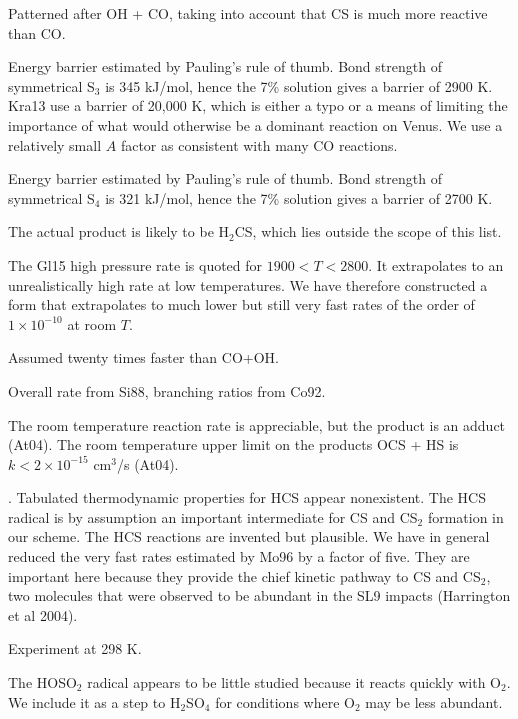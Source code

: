 \documentclass[12pt,landscape]{article}
\newcounter{reaction}
\begin{document}
  Patterned after OH + CO, taking into account that CS is much more reactive than CO.

  Energy barrier estimated by Pauling's rule of thumb.  Bond strength of symmetrical S$_3$ is 345 kJ/mol, hence the 7\% solution gives a barrier of 2900 K.  Kra13 use a barrier of 20,000 K, which is either a typo or a means of limiting the importance of what would otherwise be a dominant reaction on Venus.  We use a relatively small $A$ factor as consistent with many CO reactions.

   Energy barrier estimated by Pauling's rule of thumb.  Bond strength of symmetrical S$_4$ is 321 kJ/mol, hence the 7\% solution gives a barrier of 2700 K.  

  The actual product is likely to be H$_2$CS, which lies outside the scope of this list.

  The Gl15  high pressure rate is quoted for $1900<T<2800$.  It extrapolates to an unrealistically high rate at low temperatures. 
We have therefore constructed a form that extrapolates to much lower but still very fast rates of the order of $1\times 10^{-10}$ at room $T$.

  Assumed twenty times faster than CO+OH.

  Overall rate from Si88, branching ratios from Co92.


 The room temperature reaction rate is appreciable, but the product is an adduct (At04). The room temperature upper limit on the products OCS + HS is $k<2\!\times\!10^{-15}$ cm$^3$/s (At04). 

. Tabulated thermodynamic properties for HCS appear nonexistent.
The HCS radical is by assumption an important intermediate for CS and CS$_2$ formation in our scheme.
The HCS reactions are invented but plausible. We have in general reduced the very fast rates estimated by Mo96 by a factor of five. They are important here because they provide the chief kinetic pathway to CS and CS$_2$, two molecules that were observed to be abundant in the SL9 impacts (Harrington et al 2004). 
 
  Experiment at 298 K.

  The HOSO$_2$ radical appears to be little studied because it reacts quickly with O$_2$.
We include it as a step to H$_2$SO$_4$ for conditions where O$_2$ may be less abundant.
\end{document}
